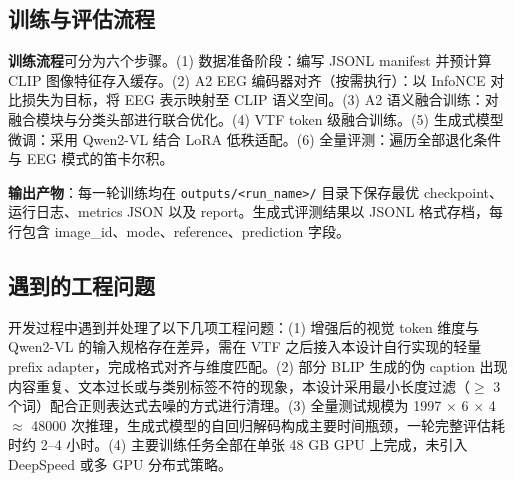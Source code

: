 \subsection{训练与评估流程}

\textbf{训练流程}可分为六个步骤。(1) 数据准备阶段：编写 JSONL manifest 并预计算 CLIP 图像特征存入缓存。(2) A2 EEG 编码器对齐（按需执行）：以 InfoNCE 对比损失为目标，将 EEG 表示映射至 CLIP 语义空间。(3) A2 语义融合训练：对融合模块与分类头部进行联合优化。(4) VTF token 级融合训练。(5) 生成式模型微调：采用 Qwen2-VL 结合 LoRA 低秩适配。(6) 全量评测：遍历全部退化条件与 EEG 模式的笛卡尔积。

\textbf{输出产物}：每一轮训练均在 \texttt{outputs/<run\_name>/} 目录下保存最优 checkpoint、运行日志、metrics JSON 以及 report。生成式评测结果以 JSONL 格式存档，每行包含 image\_id、mode、reference、prediction 字段。

\subsection{遇到的工程问题}

开发过程中遇到并处理了以下几项工程问题：(1) 增强后的视觉 token 维度与 Qwen2-VL 的输入规格存在差异，需在 VTF 之后接入本设计自行实现的轻量 prefix adapter，完成格式对齐与维度匹配。(2) 部分 BLIP 生成的伪 caption 出现内容重复、文本过长或与类别标签不符的现象，本设计采用最小长度过滤（$\geq$ 3 个词）配合正则表达式去噪的方式进行清理。(3) 全量测试规模为 1997 $\times$ 6 $\times$ 4 $\approx$ 48000 次推理，生成式模型的自回归解码构成主要时间瓶颈，一轮完整评估耗时约 2--4 小时。(4) 主要训练任务全部在单张 48 GB GPU 上完成，未引入 DeepSpeed 或多 GPU 分布式策略。